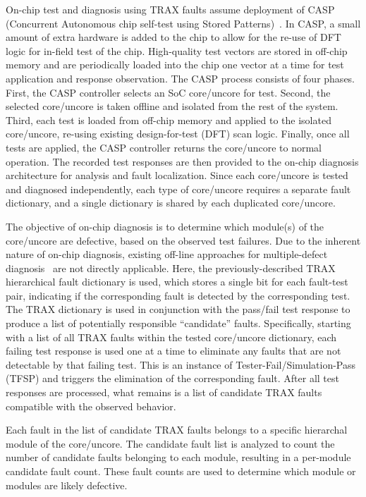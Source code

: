 On-chip test and diagnosis using TRAX faults assume deployment of CASP (Concurrent Autonomous chip self-test using Stored Patterns)~\cite{li08}.
%
In CASP, a small amount of extra hardware is added to the chip to allow for the re-use of DFT logic for in-field test of the chip.
%
High-quality test vectors are stored in off-chip memory and are periodically loaded into the chip one vector at a time for test application and response observation.
%
The CASP process consists of four phases.
%
First, the CASP controller selects an SoC core/uncore for test.
%
Second, the selected core/uncore is taken offline and isolated from the rest of the system.
%
Third, each test is loaded from off-chip memory and applied to the isolated core/uncore, re-using existing design-for-test (DFT) scan logic.
%
Finally, once all tests are applied, the CASP controller returns the core/uncore to normal operation.
%
The recorded test responses are then provided to the on-chip diagnosis architecture for analysis and fault localization.
%
Since each core/uncore is tested and diagnosed independently, each type of core/uncore requires a separate fault dictionary, and a single dictionary is shared by each duplicated core/uncore.

The objective of on-chip diagnosis is to determine which module(s) of the core/uncore are defective, based on the observed test failures.
%
Due to the inherent nature of on-chip diagnosis, existing off-line approaches for multiple-defect diagnosis~\cite{pomeranz16,yu10,chen14} are not directly applicable.
%
Here, the previously-described TRAX hierarchical fault dictionary is used, which stores a single bit for each fault-test pair, indicating if the corresponding fault is detected by the corresponding test.
%
The TRAX dictionary is used in conjunction with the pass/fail test response to produce a list of potentially responsible ``candidate'' faults.
%
Specifically, starting with a list of all TRAX faults within the tested core/uncore dictionary, each failing test response is used one at a time to eliminate any faults that are not detectable by that failing test.
%
This is an instance of Tester-Fail/Simulation-Pass (TFSP) and triggers the elimination of the corresponding fault.
%
After all test responses are processed, what remains is a list of candidate TRAX faults compatible with the observed behavior.

Each fault in the list of candidate TRAX faults belongs to a specific hierarchal module of the core/uncore.
%
The candidate fault list is analyzed to count the number of candidate faults belonging to each module, resulting in a per-module candidate fault count.
%
These fault counts are used to determine which module or modules are likely defective.

